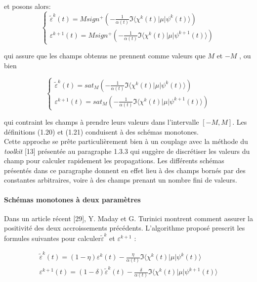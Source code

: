 \noindent et posons alors:
\begin{equation}
\begin{cases}
\tilde{\varepsilon}^k(t) = Msign^+ \left(-\frac{1}{\alpha(t)} \Im\langle \chi^k(t)|\mu|\psi^k(t)\rangle\right)\\
\varepsilon^{k+1}(t) = Msign^+ \left(-\frac{1}{\alpha(t)} \Im\langle \chi^k(t)|\mu|\psi^{k+1}(t)\rangle\right)
\end{cases}
\end{equation}

\noindent qui assure que les champs obtenus ne prennent comme valeurs que $M$ et $-M$ , ou bien

\begin{equation}
\begin{cases}
\tilde{\varepsilon}^k(t) = sat_M \left(-\frac{1}{\alpha(t)} \Im\langle \chi^k(t)|\mu|\psi^k(t)\rangle\right)\\
\varepsilon^{k+1}(t) = sat_M \left(-\frac{1}{\alpha(t)} \Im\langle \chi^k(t)|\mu|\psi^{k+1}(t)\rangle\right)
\end{cases}
\end{equation}

qui contraint les champs à prendre leurs valeurs dans l'intervalle $[-M, M ]$. Les définitions (1.20) et (1.21) conduisent à des schémas monotones.
\\Cette approche se prête particulièrement bien à un couplage avec la méthode du \textit{toolkit} [13] présentée au paragraphe 1.3.3 qui suggère de discrétiser les valeurs du champ pour calculer rapidement les propagations. Les différents schémas présentés dans ce paragraphe donnent en effet lieu à des champs bornés par des constantes arbitraires, voire à des champs prenant un nombre fini de valeurs.

\paragraph*{Schémas monotones à deux paramètres}
$ $\\Dans un article récent [29], Y. Maday et G. Turinici montrent comment assurer la positivité des deux accroissements précédents. L’algorithme proposé prescrit les formules suivantes pour calculer$\tilde{\varepsilon}^k$ et $\varepsilon^{k+1}$ :

\begin{equation}
\begin{split}
\tilde{\varepsilon}^k(t) = (1-\eta)\varepsilon^k(t)-\frac{\eta}{\alpha(t)} \Im\langle \chi^k(t)|\mu|\psi^k(t)\rangle\quad \\
\varepsilon^{k+1}(t) = (1-\delta)\tilde{\varepsilon}^k(t) -\frac{\delta}{\alpha(t)} \Im\langle \chi^k(t)|\mu|\psi^{k+1}(t)\rangle
\end{split}
\end{equation}

